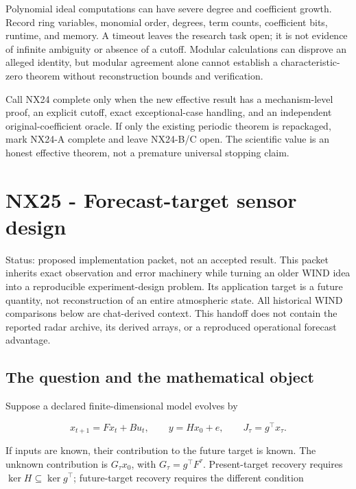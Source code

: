 \documentclass[
  11pt,
  a4paper,
]{report}
\begin{document}
Polynomial ideal computations can have severe degree and coefficient
growth. Record ring variables, monomial order, degrees, term counts,
coefficient bits, runtime, and memory. A timeout leaves the research
task open; it is not evidence of infinite ambiguity or absence of a
cutoff. Modular calculations can disprove an alleged identity, but
modular agreement alone cannot establish a characteristic-zero theorem
without reconstruction bounds and verification.

Call NX24 complete only when the new effective result has a
mechanism-level proof, an explicit cutoff, exact exceptional-case
handling, and an independent original-coefficient oracle. If only the
existing periodic theorem is repackaged, mark NX24-A complete and leave
NX24-B/C open. The scientific value is an honest effective theorem, not
a premature universal stopping claim.

\hypertarget{nx25---forecast-target-sensor-design}{%
\chapter{NX25 - Forecast-target sensor
design}\label{nx25---forecast-target-sensor-design}}

Status: proposed implementation packet, not an accepted result. This
packet inherits exact observation and error machinery while turning an
older WIND idea into a reproducible experiment-design problem. Its
application target is a future quantity, not reconstruction of an entire
atmospheric state. All historical WIND comparisons below are
chat-derived context. This handoff does not contain the reported radar
archive, its derived arrays, or a reproduced operational forecast
advantage.

\hypertarget{the-question-and-the-mathematical-object}{%
\section{The question and the mathematical
object}\label{the-question-and-the-mathematical-object}}

Suppose a declared finite-dimensional model evolves by

\[
 x_{t+1}=Fx_t+Bu_t,\qquad y=Hx_0+e,\qquad J_\tau=g^\top x_\tau.
\]

If inputs are known, their contribution to the future target is known.
The unknown contribution is \(G_\tau x_0\), with
\(G_\tau=g^\top F^\tau\). Present-target recovery requires
\(\ker H\subseteq\ker g^\top\); future-target recovery requires the
different condition
\end{document}
